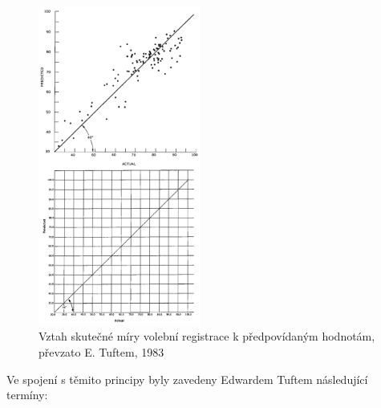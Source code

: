 \documentclass[12pt,]{article}
\begin{document}
\begin{minipage}[H]{0.475\textwidth}
\begin{figure}[H]
    \includegraphics[height = 10.5cm]{fig/data_ink}
    \caption{Vztah skutečné míry volební registrace k předpovídaným hodnotám, převzato E. Tuftem, 1983}
    \label{fig:ch1.6}
 \end{figure}
\end{minipage}

Ve spojení s těmito principy byly zavedeny Edwardem Tuftem následující
termíny:
\end{document}
